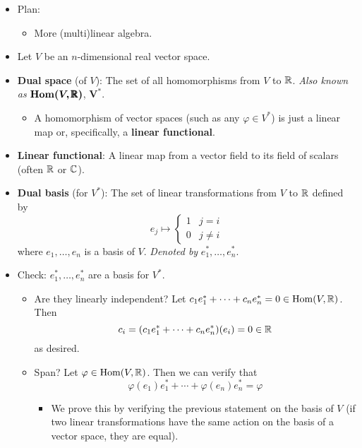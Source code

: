 \documentclass[../notes.tex]{subfiles}
\begin{document}
\begin{itemize}
    \item {}Plan:
    \begin{itemize}
        \item More (multi)linear algebra.
    \end{itemize}
    \item Let $V$ be an $n$-dimensional real vector space.
    \item \textbf{Dual space} (of $V$): The set of all homomorphisms from $V$ to $\mathbb{R}$. \emph{Also known as} $\bm{\Hom(V,\pmb{\R})}$, $\bm{V^*}$.
    \begin{itemize}
        \item A homomorphism of vector spaces (such as any $\varphi\in V^*$) is just a linear map or, specifically, a \textbf{linear functional}.
    \end{itemize}
    \item \textbf{Linear functional}: A linear map from a vector field to its field of scalars (often $\mathbb{R}$ or $\mathbb{C}$).
    \item \textbf{Dual basis} (for $V^*$): The set of linear transformations from $V$ to $\mathbb{R}$ defined by
    \begin{equation*}
        e_j \mapsto
        \begin{cases}
            1 & j=i\\
            0 & j\neq i
        \end{cases}
    \end{equation*}
    where $e_1,\dots,e_n$ is a basis of $V$. \emph{Denoted by} $e_1^*,\dots,e_n^*$.
    \item Check: $e_1^*,\dots,e_n^*$ are a basis for $V^*$.
    \begin{itemize}
        \item Are they linearly independent? Let $c_1e_1^*+\cdots+c_ne_n^*=0\in\operatorname{Hom}(V,\mathbb{R})$. Then
        \begin{equation*}
            c_i = (c_1e_1^*+\cdots+c_ne_n^*)(e_i) = 0\in\mathbb{R}
        \end{equation*}
        as desired.
        \item Span? Let $\varphi\in\operatorname{Hom}(V,\mathbb{R})$. Then we can verify that
        \begin{equation*}
            \varphi(e_1)e_1^*+\cdots+\varphi(e_n)e_n^* = \varphi
        \end{equation*}
        \begin{itemize}
            \item We prove this by verifying the previous statement on the basis of $V$ (if two linear transformations have the same action on the basis of a vector space, they are equal).

\end{itemize}
\end{itemize}
\end{itemize}
\end{document}

